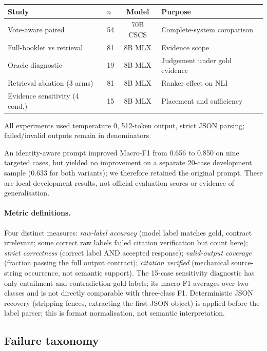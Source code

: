 \documentclass[10pt,a4paper]{article}
\begin{document}
\begin{center}\small
\begin{tabular}{@{}llcl@{}}
\toprule
Study & $n$ & Model & Purpose \\
\midrule
Vote-aware paired & 54 & 70B CSCS & Complete-system comparison \\
Full-booklet vs retrieval & 81 & 8B MLX & Evidence scope \\
Oracle diagnostic & 19 & 8B MLX & Judgement under gold evidence \\
Retrieval ablation (3 arms) & 81 & 8B MLX & Ranker effect on NLI \\
Evidence sensitivity (4 cond.) & 15 & 8B MLX & Placement and sufficiency \\
\bottomrule
\end{tabular}
\end{center}

All experiments used temperature 0, 512-token output, strict JSON parsing; failed/invalid outputs remain in denominators.

An identity-aware prompt improved Macro-F1 from 0.656 to 0.850 on nine targeted cases, but yielded no improvement on a separate 20-case development sample (0.633 for both variants); we therefore retained the original prompt. These are local development results, not official evaluation scores or evidence of generalisation.

\paragraph{Metric definitions.}
Four distinct measures: \emph{raw-label accuracy} (model label matches gold, contract irrelevant; some correct raw labels failed citation verification but count here); \emph{strict correctness} (correct label AND accepted response); \emph{valid-output coverage} (fraction passing the full output contract); \emph{citation verified} (mechanical source-string occurrence, not semantic support). The 15-case sensitivity diagnostic has only entailment and contradiction gold labels; its macro-F1 averages over two classes and is not directly comparable with three-class F1. Deterministic JSON recovery (stripping fences, extracting the first JSON object) is applied before the label parser; this is format normalisation, not semantic interpretation.

\subsection{Failure taxonomy}
\end{document}
